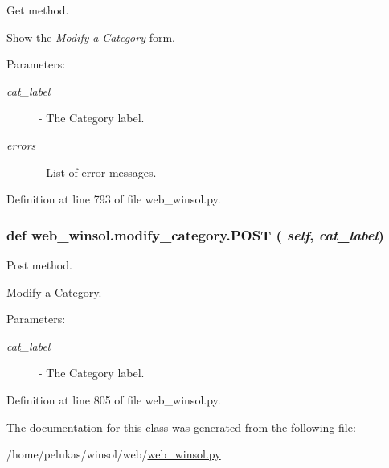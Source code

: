 Get method. 

Show the {\em Modify\/} {\em a\/} {\em Category\/} form.

\begin{Desc}
\item[Parameters:]
\begin{description}
\item[{\em cat\_\-label}]- The Category label. \item[{\em errors}]- List of error messages. \end{description}
\end{Desc}


Definition at line 793 of file web\_\-winsol.py.\hypertarget{classweb__winsol_1_1modify__category_aca67c7ee533f669aac3258ec9f3eb5a}{
\subsubsection[POST]{\setlength{\rightskip}{0pt plus 5cm}def web\_\-winsol.modify\_\-category.POST ( {\em self},  {\em cat\_\-label})}}
\label{classweb__winsol_1_1modify__category_aca67c7ee533f669aac3258ec9f3eb5a}


Post method. 

Modify a Category.

\begin{Desc}
\item[Parameters:]
\begin{description}
\item[{\em cat\_\-label}]- The Category label. \end{description}
\end{Desc}


Definition at line 805 of file web\_\-winsol.py.

The documentation for this class was generated from the following file:\begin{CompactItemize}
\item 
/home/pelukas/winsol/web/\hyperlink{web__winsol_8py}{web\_\-winsol.py}\end{CompactItemize}
